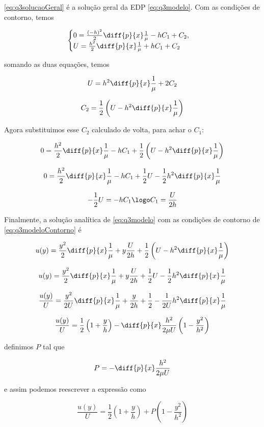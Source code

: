 \eqref{eq:q3solucaoGeral} é a solução geral da EDP \eqref{eq:q3modelo}. Com as condições de contorno,
temos

\[
    \begin{cases}
        0 = \frac{(-h)^2}{2}\diff{p}{x}\frac{1}{\mu} - hC_1 + C_2 , \\
        U = \frac{h^2}{2}\diff{p}{x}\frac{1}{\mu} + hC_1 + C_2 
    \end{cases} 
\]  

\noindent somando as duas equações, temos  

\[ U = h^2\diff{p}{x}\frac{1}{\mu} + 2C_2 \]

\[ C_2 = \frac{1}{2} \left(U - h^2\diff{p}{x}\frac{1}{\mu}\right)  \]

Agora substituimos esse $C_2$ calculado de volta, para achar o $C_1$:

\[ 0 = \frac{h^2}{2}\diff{p}{x}\frac{1}{\mu} - hC_1 + \frac{1}{2} \left(U - h^2\diff{p}{x}\frac{1}{\mu}\right)  \]

\[ 0 = \frac{h^2}{2}\diff{p}{x}\frac{1}{\mu} - hC_1 + \frac{1}{2}U - \frac{1}{2} h^2\diff{p}{x}\frac{1}{\mu} \]

\[ - \frac{1}{2}U = - hC_1 \logo C_1 = \frac{U}{2h} \]

Finalmente, a solução analítica de \eqref{eq:q3modelo} com as condições de contorno de 
\eqref{eq:q3modeloContorno} é

\[ u(y) = \frac{y^2}{2}\diff{p}{x}\frac{1}{\mu} + y\frac{U}{2h} + \frac{1}{2} \left(U - h^2\diff{p}{x}\frac{1}{\mu}\right)  \]

\[ u(y) = \frac{y^2}{2}\diff{p}{x}\frac{1}{\mu} + y\frac{U}{2h} + \frac{1}{2}U - \frac{1}{2} h^2\diff{p}{x}\frac{1}{\mu}  \]

\[ \frac{u(y)}{U} = \frac{y^2}{2U}\diff{p}{x}\frac{1}{\mu} + \frac{y}{2h} + \frac{1}{2} - \frac{1}{2U} h^2\diff{p}{x}\frac{1}{\mu}  \]

\[ \frac{u(y)}{U} = \frac{1}{2} \left(1 + \frac{y}{h}\right) -  \diff{p}{x} \frac{h^2}{2\mu U} \left(1 -  \frac{y^2}{h^2} \right) \]

\noindent definimos $P$ tal que

\[ P = - \diff{p}{x}  \frac{h^2}{2\mu U} \]

\noindent e assim podemos reescrever a expressão como

\begin{equation}\label{eq:solucaoAnalitica}
    \frac{u(y)}{U} = \frac{1}{2} \left(1 + \frac{y}{h}\right) + P\left(1 - \frac{y^2}{h^2}\right) 
\end{equation}

